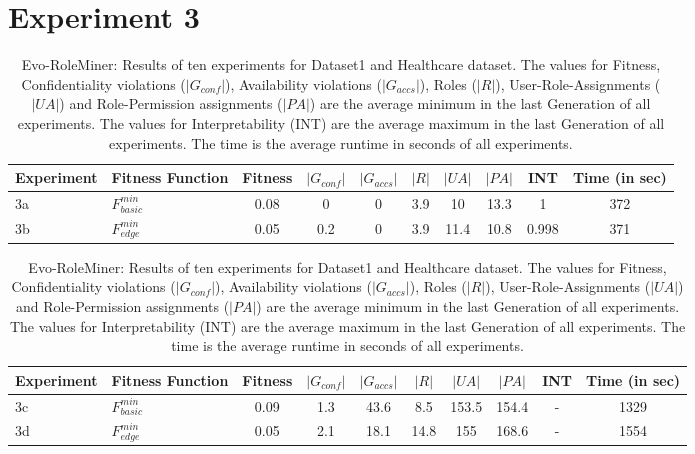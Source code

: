 \section{Experiment 3}
\label{sec:A_Exp3}
	\begin{table}[H]
		\centering
		\caption{Evo-RoleMiner: Results of ten experiments for Dataset1 and Healthcare dataset. The values for Fitness, Confidentiality violations ($|G_{conf}|$), Availability violations ($|G_{accs}|$), Roles ($|R|$), User-Role-Assignments ($|UA|$) and Role-Permission assignments ($|PA|$) are the average minimum in the last Generation of all experiments. The values for Interpretability (INT) are the average maximum in the last Generation of all experiments. The time is the average runtime in seconds of all experiments.}
		\label{tab:exp3_results}
		\begin{adjustbox}{width=\textwidth}
			\begin{tabular}{|l|l|c|c|c|c|c|c|c|c|}
				\hline
				\rowcolor{myGray} 
				\textbf{Experiment} & \textbf{Fitness Function} & \textbf{Fitness} & \textbf{$|G_{conf}|$} & \textbf{$|G_{accs}|$} & \textbf{$|R|$} & \textbf{$|UA|$} & \textbf{$|PA|$} & \textbf{INT} & \textbf{Time (in sec)}\\ \hline
				3a & $F_{basic}^{min}$ &   0.08   &   0   &   0   &   3.9   &   10   &   13.3   &   1   & 372\\ \hline
				3b & $F_{edge}^{min}$ &   0.05   &   0.2   &   0   &   3.9   &   11.4   &   10.8   &   0.998   & 371\\ \hline  
			\end{tabular}
		\end{adjustbox}
		\bigskip
		\begin{adjustbox}{width=\textwidth}
			\begin{tabular}{|l|l|c|c|c|c|c|c|c|c|}
				\hline
				\rowcolor{myGray} 
				\textbf{Experiment} & \textbf{Fitness Function} & \textbf{Fitness} & \textbf{$|G_{conf}|$} & \textbf{$|G_{accs}|$} & \textbf{$|R|$} & \textbf{$|UA|$} & \textbf{$|PA|$} & \textbf{INT} & \textbf{Time (in sec)}\\ \hline
				3c & $F_{basic}^{min}$ &   0.09   &   1.3   &   43.6   &   8.5   &   153.5   &   154.4   &   -   & 1329\\ \hline
				3d & $F_{edge}^{min}$  &   0.05   &   2.1   &   18.1   &   14.8   &   155   &   168.6   &   -   & 1554\\ \hline
			\end{tabular}
		\end{adjustbox}
	\end{table}
	
